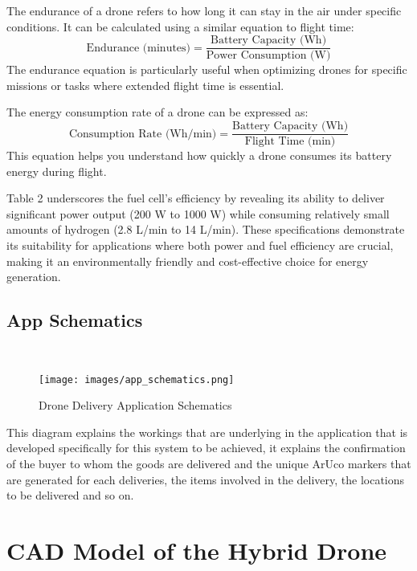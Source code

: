 \documentclass[preprint,12pt]{elsarticle}
\begin{document}
The endurance of a drone refers to how long it can stay in the air under specific conditions. It can be calculated using a similar equation to flight time:
\begin{equation}
\text{Endurance (minutes)} = \frac{\text{Battery Capacity (Wh)}}{\text{Power Consumption (W)}}
\end{equation}
The endurance equation is particularly useful when optimizing drones for specific missions or tasks where extended flight time is essential.

The energy consumption rate of a drone can be expressed as:
\begin{equation}
\text{Consumption Rate (Wh/min)} = \frac{\text{Battery Capacity (Wh)}}{\text{Flight Time (min)}}
\end{equation}
This equation helps you understand how quickly a drone consumes its battery energy during flight.

Table 2  underscores the fuel cell's efficiency by revealing its ability to deliver significant power output (200 W to 1000 W) while consuming relatively small amounts of hydrogen (2.8 L/min to 14 L/min). These specifications demonstrate its suitability for applications where both power and fuel efficiency are crucial, making it an environmentally friendly and cost-effective choice for energy generation.

\subsection{App Schematics}\\

\begin{figure}[!htbp]
    \vspace{-2.5cm}
    \centering
    \texttt{[image: images/app\_schematics.png]}
    \caption{Drone Delivery Application Schematics}
\end{figure}

This diagram explains the workings that are underlying in the application that is developed specifically for this system to be achieved, it explains the confirmation of the buyer to whom the goods are delivered and the unique ArUco markers that are generated for each deliveries, the items involved in the delivery, the locations to be delivered and so on.
\section{CAD Model of the Hybrid Drone}
\end{document}

